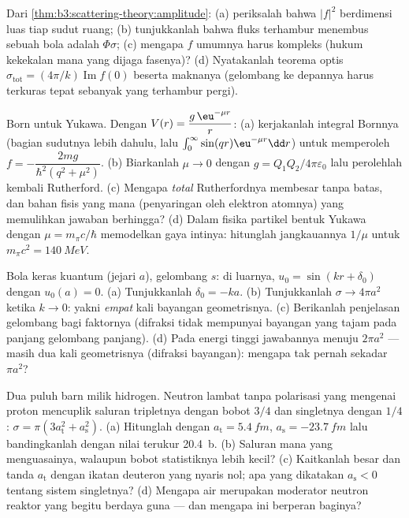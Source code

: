 \begin{exercise}[$\star$]\label{exo:b3:scattering-theory:4}
Dari \cref{thm:b3:scattering-theory:amplitude}: (a) periksalah bahwa
$|f|^2$ berdimensi luas tiap sudut ruang; (b) tunjukkanlah bahwa fluks
terhambur menembus sebuah bola adalah $\Phi\sigma$; (c) mengapa $f$
umumnya harus kompleks (hukum kekekalan mana yang dijaga fasenya)? (d)
Nyatakanlah teorema optis $\sigma_{\text{tot}} =
(4\pi/k)\operatorname{Im}f(0)$ beserta maknanya (gelombang ke depannya
harus terkuras tepat sebanyak yang terhambur pergi).
\end{exercise}

\begin{exercise}[$\star\star$]\label{exo:b3:scattering-theory:5}
Born untuk Yukawa. Dengan $V(r) = \dfrac{g\,\eu^{-\mu r}}{r}$: (a)
kerjakanlah integral Bornnya (bagian sudutnya lebih dahulu, lalu $\int_0^
\infty\sin(qr)\eu^{-\mu r}\dd r$) untuk memperoleh $f = -\dfrac{2mg}
{\hbar^2(q^2 + \mu^2)}$. (b) Biarkanlah $\mu \to 0$ dengan $g =
Q_1Q_2/4\pi\varepsilon_0$ lalu perolehlah kembali Rutherford. (c) Mengapa
 \emph{total} Rutherfordnya membesar tanpa batas, dan
bahan fisis yang mana (penyaringan oleh elektron atomnya) yang
memulihkan jawaban berhingga? (d) Dalam fisika partikel bentuk Yukawa dengan $\mu =
m_\pi c/\hbar$ memodelkan gaya intinya: hitunglah
jangkauannya $1/\mu$ untuk $m_\pi c^2 = \qty{140}{MeV}$.
\end{exercise}

\begin{exercise}[$\star\star$]\label{exo:b3:scattering-theory:6}
Bola keras kuantum (jejari $a$), gelombang $s$: di luarnya, $u_0 =
\sin(kr + \delta_0)$ dengan $u_0(a) = 0$. (a) Tunjukkanlah $\delta_0 = -ka$.
(b) Tunjukkanlah $\sigma \to 4\pi a^2$ ketika $k \to 0$: yakni
\emph{empat} kali bayangan geometrisnya. (c) Berikanlah penjelasan
gelombang bagi faktornya (difraksi tidak mempunyai bayangan yang tajam
pada panjang gelombang panjang). (d) Pada energi tinggi jawabannya
menuju $2\pi a^2$ --- masih dua kali geometrisnya (difraksi bayangan):
mengapa tak pernah sekadar $\pi a^2$?
\end{exercise}

\begin{exercise}[$\star\star$]\label{exo:b3:scattering-theory:7}
Dua puluh barn milik hidrogen. Neutron lambat tanpa polarisasi yang
mengenai proton mencuplik saluran tripletnya dengan bobot $3/4$ dan
singletnya dengan $1/4$: $\sigma = \pi(3a_{\text{t}}^2 +
a_{\text{s}}^2)$. (a) Hitunglah dengan $a_{\text{t}} = \qty{5.4}{fm}$,
$a_{\text{s}} = \qty{-23.7}{fm}$ lalu bandingkanlah dengan nilai terukur
\qty{20.4}{b}. (b) Saluran mana yang menguasainya, walaupun bobot
statistiknya lebih kecil? (c) Kaitkanlah besar dan tanda $a_{\text{t}}$
dengan ikatan deuteron yang nyaris nol; apa yang dikatakan
$a_{\text{s}} < 0$ tentang sistem singletnya? (d) Mengapa air merupakan
moderator neutron reaktor yang begitu berdaya guna --- dan mengapa
 ini berperan baginya?
\end{exercise}

